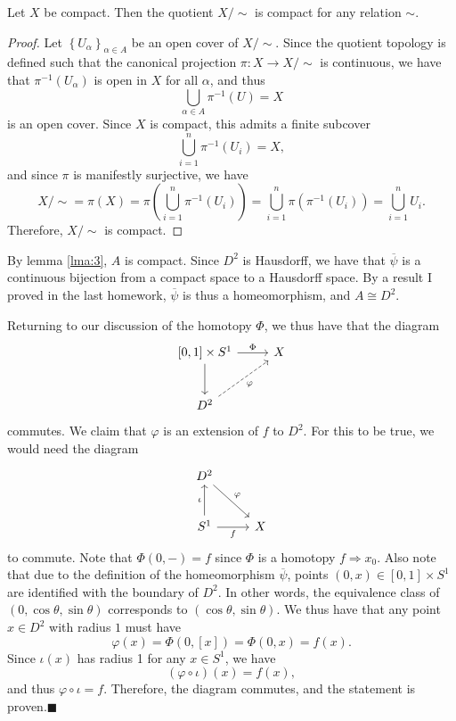 \documentclass[11pt, letterpaper]{article}
\begin{document}
\begin{lemma}\label{lma:3}
	Let $X$ be compact. Then the quotient $X/\sim $ is compact for any relation $\sim $.
\end{lemma}
\begin{proof}
	Let $\left\{ U_{\alpha }  \right\}_{\alpha \in A} $ be an open cover of $X/\sim $. Since the quotient topology is defined such that the canonical projection $\pi : X \to X/\sim $ is continuous, we have that $\pi ^{-1} (U_\alpha )$ is open in $X$ for all $\alpha $, and thus
	\[
		\bigcup_{\alpha \in A} \pi ^{-1} (U)=X
	\]
	is an open cover. Since $X$ is compact, this admits a finite subcover
	\[
		\bigcup_{i=1} ^n \pi ^{-1} (U_i)=X,
	\]
	and since $\pi $ is manifestly surjective, we have
	\[
		X/\sim =\pi (X)=\pi \left( \bigcup_{i=1}^n \pi ^{-1} (U_i) \right) =\bigcup_{i=1}^n \pi (\pi ^{-1} (U_i))=\bigcup_{i=1}^n U_i
	.\]
	Therefore, $X/\sim $ is compact.
\end{proof}

By lemma \ref{lma:3}, $A$ is compact. Since $D^2$ is Hausdorff, we have that $\overline{\psi }$ is a continuous bijection from a compact space to a Hausdorff space. By a result I proved in the last homework, $\overline{\psi } $ is thus a homeomorphism, and $A\cong D^2$.

Returning to our discussion of the homotopy $\Phi$, we thus have that the diagram
\[\begin{tikzcd}[row sep = 2.5em, column sep = 2.5em]
\left[ 0,1 \right] \times S^1\ar[" \Phi  ", r] \ar[d]  & X \\
D^2\ar[dashed," \varphi "',  ur]  & 
\end{tikzcd}\]
commutes. We claim that $\varphi $ is an extension of $f$ to $D^2$. For this to be true, we would need the diagram
\[\begin{tikzcd}[row sep = 2.5em, column sep = 2.5em]
D^2\ar[" \varphi  ", dr]  &  \\
S^1\ar[" \iota  ", u] \ar[" f "', r]  & X
\end{tikzcd}\]
to commute. Note that $\Phi (0,-)=f$ since $\Phi $ is a homotopy $f\Rightarrow x_0$. Also note that due to the definition of the homeomorphism $\overline{\psi } $, points $(0,x)\in [0,1]\times S^1$ are identified with the boundary of $D^2$. In other words, the equivalence class of $(0,\cos \theta ,\sin \theta )$ corresponds to $(\cos \theta ,\sin \theta )$. We thus have that any point $x\in D^2$ with radius $1$ must have
\[
	\varphi (x)=\Phi (0,[x])=\Phi (0,x)=f(x)
.\]
Since $\iota (x)$ has radius 1 for any $x\in S^1$, we have
\[
	(\varphi \circ \iota )(x)=f(x),
\]
and thus $\varphi \circ \iota =f$. Therefore, the diagram commutes, and the statement is proven.\hfill$\blacksquare$
\end{document}
